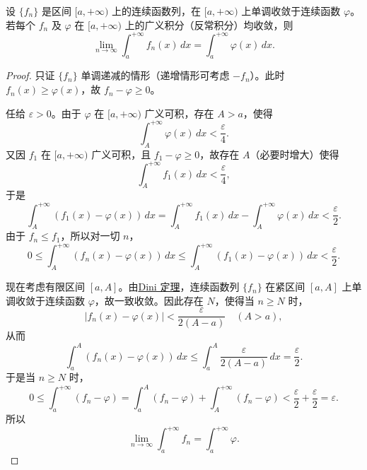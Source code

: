 \documentclass[../../main.tex]{subfiles}%
\begin{document}
\begin{proposition}\label{proposition:单调收敛积分可交换-无穷区间情形}
设 $\{f_n\}$ 是区间 $[a,+\infty)$ 上的连续函数列，在 $[a,+\infty)$ 上单调收敛于连续函数 $\varphi$。若每个 $f_n$ 及 $\varphi$ 在 $[a,+\infty)$ 上的广义积分（反常积分）均收敛，则
\[
\lim_{n\to\infty}\int_a^{+\infty} f_n(x)\,dx
=
\int_a^{+\infty} \varphi(x)\,dx .
\]
\end{proposition}
\begin{proof}
只证 $\{f_n\}$ 单调递减的情形（递增情形可考虑 $-f_n$）。此时 $f_n(x)\geqslant \varphi(x)$，故 $f_n-\varphi\geqslant 0$。

任给 $\varepsilon>0$。由于 $\varphi$ 在 $[a,+\infty)$ 广义可积，存在 $A>a$，使得
\[
\int_A^{+\infty} \varphi(x)\,dx < \frac{\varepsilon}{4}.
\]
又因 $f_1$ 在 $[a,+\infty)$ 广义可积，且 $f_1-\varphi\geqslant 0$，故存在 $A$（必要时增大）使得
\[
\int_A^{+\infty} f_1(x)\,dx < \frac{\varepsilon}{4},
\]
于是
\[
\int_A^{+\infty} (f_1(x)-\varphi(x))\,dx
=
\int_A^{+\infty} f_1(x)\,dx-\int_A^{+\infty} \varphi(x)\,dx
< \frac{\varepsilon}{2}.
\]
由于 $f_n\leqslant f_1$，所以对一切 $n$，
\[
0\leqslant \int_A^{+\infty} (f_n(x)-\varphi(x))\,dx
\leqslant \int_A^{+\infty} (f_1(x)-\varphi(x))\,dx
< \frac{\varepsilon}{2}.
\]

现在考虑有限区间 $[a,A]$。由\hyperref[theorem:Dini定理(数分版本)]{Dini 定理}，连续函数列 $\{f_n\}$ 在紧区间 $[a,A]$ 上单调收敛于连续函数 $\varphi$，故一致收敛。因此存在 $N$，使得当 $n\geqslant N$ 时，
\[
|f_n(x)-\varphi(x)| < \frac{\varepsilon}{2(A-a)} \quad (A>a),
\]
从而
\[
\int_a^A (f_n(x)-\varphi(x))\,dx
\leqslant \int_a^A \frac{\varepsilon}{2(A-a)}\,dx
= \frac{\varepsilon}{2}.
\]
于是当 $n\geqslant N$ 时，
\[
0\leqslant \int_a^{+\infty} (f_n-\varphi)
=
\int_a^A (f_n-\varphi)+\int_A^{+\infty}(f_n-\varphi)
< \frac{\varepsilon}{2}+\frac{\varepsilon}{2}=\varepsilon.
\]
所以
\[
\lim_{n\to\infty}\int_a^{+\infty} f_n
=
\int_a^{+\infty}\varphi.
\]\end{proof}
\end{document}
